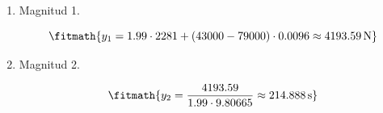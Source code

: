 \begin{enumerate}

\item Magnitud 1.

\[\fitmath{y_{1}=1.99\cdot 2281+\left(43000-79000\right)\cdot 0.0096\approx 4193.59\,\mathrm{N}}\]

\item Magnitud 2.

\[\fitmath{y_{2}=\frac{4193.59}{1.99\cdot 9.80665}\approx 214.888\,\mathrm{s}}\]

\end{enumerate}
